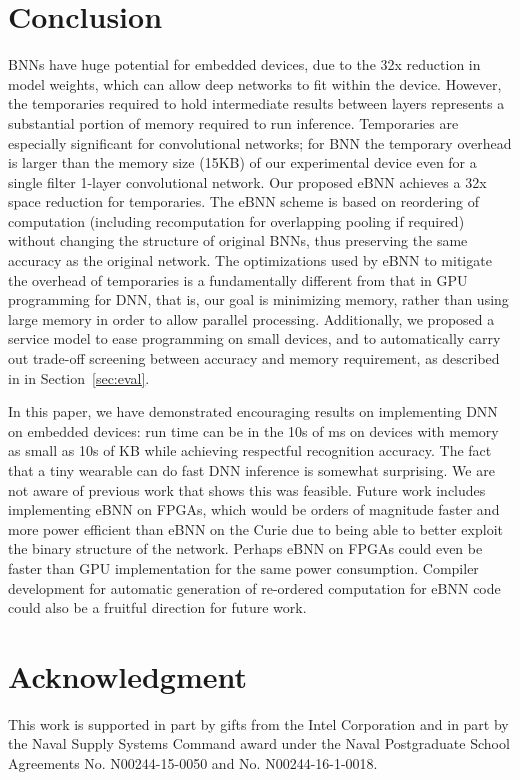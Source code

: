 \documentclass[10pt,emptycopyrightspace]{ewsn-proc}
\begin{document}
    










\section{Conclusion}
\label{sec:conclusion}
BNNs have huge potential for embedded devices, due to the 32x reduction in model weights, which can allow deep networks to fit within the device. However, the temporaries required to hold intermediate results between layers represents a substantial portion of memory required to run inference. Temporaries are especially significant for convolutional networks; for BNN the temporary overhead is larger than the memory size (15KB) of our experimental device even for a single filter 1-layer convolutional network. Our proposed eBNN achieves a 32x space reduction for temporaries. The eBNN scheme is based on reordering of computation (including recomputation for overlapping pooling if required) without changing the structure of original BNNs, thus preserving the same accuracy as the original network. The optimizations used by eBNN to mitigate the overhead of temporaries is a fundamentally different from that in GPU programming for DNN, that is, our goal is minimizing memory, rather than using large memory in order to allow parallel processing. Additionally, we proposed a service model to ease programming on small devices, and to automatically carry out trade-off screening between accuracy and memory requirement, as described in in Section~\ref{sec:eval}.

In this paper, we have demonstrated encouraging results on implementing DNN on embedded devices: run time can be in the 10s of ms on devices with memory as small as 10s of KB while achieving respectful recognition accuracy. The fact that a tiny wearable can do fast DNN inference is somewhat surprising. We are not aware of previous work that shows this was feasible. Future work includes implementing eBNN on FPGAs, which would be orders of magnitude faster and more power efficient than eBNN on the Curie due to being able to better exploit the binary structure of the network. Perhaps eBNN on FPGAs could even be faster than GPU implementation for the same power consumption. Compiler development for automatic generation of re-ordered computation for eBNN code could also be a fruitful direction for future work.


\section*{Acknowledgment}
  This work is supported in part by gifts from the Intel Corporation
  and in part by the Naval Supply Systems Command award under the
  Naval Postgraduate School Agreements No. N00244-15-0050
  and No. N00244-16-1-0018.





\end{document}
